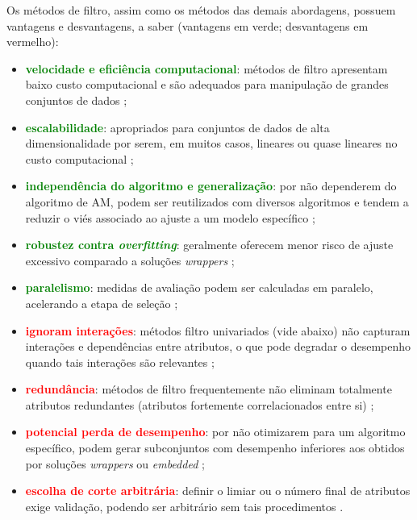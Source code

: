 Os métodos de filtro, assim como os métodos das demais abordagens, possuem vantagens e desvantagens, a saber (vantagens em verde; desvantagens em vermelho):
\begin{itemize}
    \item \textcolor{green}{\textbf{velocidade e eficiência computacional}}: métodos de filtro apresentam baixo custo computacional e são adequados para manipulação de grandes conjuntos de dados \cite{Theng2024,Dhal2022};
    
    \item \textcolor{green}{\textbf{escalabilidade}}: apropriados para conjuntos de dados de alta dimensionalidade por serem, em muitos casos, lineares ou quase lineares no custo computacional \cite{Dhal2022,bolon2018scalability};
    
    \item \textcolor{green}{\textbf{independência do algoritmo e generalização}}: por não dependerem do algoritmo de AM, podem ser reutilizados com diversos algoritmos e tendem a reduzir o viés associado ao ajuste a um modelo específico \cite{EBRAHIMIWARKIANI2025129372,BARBIERI2024123667};
    
    \item \textcolor{green}{\textbf{robustez contra \emph{overfitting}}}: geralmente oferecem menor risco de ajuste excessivo comparado a soluções \textit{wrappers} \cite{reunanen2012overfitting};
    
    \item \textcolor{green}{\textbf{paralelismo}}: medidas de avaliação podem ser calculadas em paralelo, acelerando a etapa de seleção \cite{de2006parallelizing};
    
    \item \textcolor{red}{\textbf{ignoram interações}}: métodos filtro univariados (vide abaixo) não capturam interações e dependências entre atributos, o que pode degradar o desempenho quando tais interações são relevantes \cite{Dhal2022,Theng2024,EBRAHIMIWARKIANI2025129372};
    
    \item \textcolor{red}{\textbf{redundância}}: métodos de filtro frequentemente não eliminam totalmente atributos redundantes (atributos fortemente correlacionados entre si) \cite{KHAIRE20221060,Theng2024,EBRAHIMIWARKIANI2025129372};
    
    \item \textcolor{red}{\textbf{potencial perda de desempenho}}: por não otimizarem para um algoritmo específico, podem gerar subconjuntos com desempenho inferiores aos obtidos por soluções \textit{wrappers} ou \textit{embedded} \cite{Dhal2022,EBRAHIMIWARKIANI2025129372};
    
    \item \textcolor{red}{\textbf{escolha de corte arbitrária}}: definir o limiar ou o número final de atributos exige validação, podendo ser arbitrário sem tais procedimentos \cite{Theng2024}.
\end{itemize}

